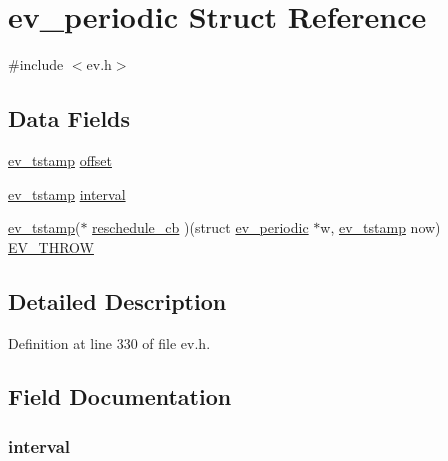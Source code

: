\hypertarget{structev__periodic}{\section{ev\-\_\-periodic \-Struct \-Reference}
\label{structev__periodic}
}


{\ttfamily \#include $<$ev.\-h$>$}

\subsection*{\-Data \-Fields}
\begin{DoxyCompactItemize}
\item 
\hyperlink{ev_8h_add71e34ce2b04bbf7eb6f31a850814e8}{ev\-\_\-tstamp} \hyperlink{structev__periodic_ac00ce9c33f0c138a374ae6d957434253}{offset}
\item 
\hyperlink{ev_8h_add71e34ce2b04bbf7eb6f31a850814e8}{ev\-\_\-tstamp} \hyperlink{structev__periodic_a710c94a682e5e9281b2e5162e265b726}{interval}
\item 
\hyperlink{ev_8h_add71e34ce2b04bbf7eb6f31a850814e8}{ev\-\_\-tstamp}($\ast$ \hyperlink{structev__periodic_a9db54a5bc43f82d7d1b46be67a2115eb}{reschedule\-\_\-cb} )(struct \hyperlink{structev__periodic}{ev\-\_\-periodic} $\ast$w, \hyperlink{ev_8h_add71e34ce2b04bbf7eb6f31a850814e8}{ev\-\_\-tstamp} now) \hyperlink{ev_8h_a473b5b606fdd3d484227542605e80bcf}{\-E\-V\-\_\-\-T\-H\-R\-O\-W}
\end{DoxyCompactItemize}


\subsection{\-Detailed \-Description}


\-Definition at line 330 of file ev.\-h.



\subsection{\-Field \-Documentation}
\hypertarget{structev__periodic_a710c94a682e5e9281b2e5162e265b726}{
\subsubsection[{interval}]{ {\bf interval}}}\label{structev__periodic_a710c94a682e5e9281b2e5162e265b726}



